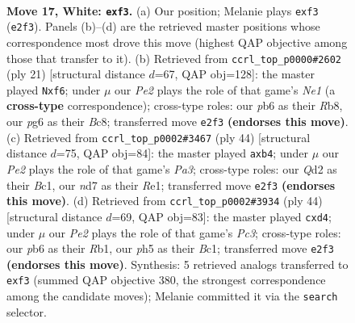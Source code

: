 \documentclass[11pt]{article}
\begin{document}
\clearpage

\begin{figure}[p]\centering
\begin{subfigure}{0.46\textwidth}\centering
\resizebox{\linewidth}{!}{%
\newchessgame
\chessboard[
  setfen={r1bq1r1k/2pn1pb1/1p1p1np1/3P3p/p1P5/2N2pPB/PPNQP2P/1RB2RK1 w - - 0 17},
  showmover=false,
  pgfstyle=straightmove, color=movearrow, markmove={e2-f3}
]}
\caption{}
\end{subfigure}\hfill
\begin{subfigure}{0.46\textwidth}\centering
\resizebox{\linewidth}{!}{%
\newchessgame
\chessboard[
  setfen={1rbqnrk1/p2pb1pp/2n1pP2/1pp5/8/2PP1NP1/PP1N1PBP/R1BQR1K1 b - - 0 11},
  showmover=false,
  pgfstyle=straightmove, color=movearrow, markmove={e8-f6}
]}
\caption{}
\end{subfigure}
\\[4pt]
\begin{subfigure}{0.46\textwidth}\centering
\resizebox{\linewidth}{!}{%
\newchessgame
\chessboard[
  setfen={b2rrbk1/2qn1pp1/2pp1n1p/1p6/1p1PP3/P4NNP/2B1QPP1/1RB1R1K1 w - - 0 23},
  showmover=false,
  pgfstyle=straightmove, color=movearrow, markmove={a3-b4}
]}
\caption{}
\end{subfigure}\hfill
\begin{subfigure}{0.46\textwidth}\centering
\resizebox{\linewidth}{!}{%
\newchessgame
\chessboard[
  setfen={b2rrbk1/2qn1pp1/2pp1n1p/1p6/1P1pP3/2P2NNP/2B1QPP1/1RB1R1K1 w - - 0 23},
  showmover=false,
  pgfstyle=straightmove, color=movearrow, markmove={c3-d4}
]}
\caption{}
\end{subfigure}
\caption{\textbf{Move 17, White: \texttt{exf3}.} (a) Our position; Melanie plays \texttt{exf3} (\texttt{e2f3}). Panels (b)--(d) are the retrieved master positions whose correspondence most drove this move (highest QAP objective among those that transfer to it). (b) Retrieved from \texttt{ccrl\_top\_p0000\#2602} (ply 21) [structural distance $d$=67, QAP obj=128]: the master played \texttt{Nxf6}; under $\mu$ our \emph{Pe2} plays the role of that game's \emph{Ne1} (a \textbf{cross-type} correspondence); cross-type roles: our \emph{p}b6 as their \emph{R}b8, our \emph{p}g6 as their \emph{B}c8; transferred move \texttt{e2f3} \textbf{(endorses this move)}. (c) Retrieved from \texttt{ccrl\_top\_p0002\#3467} (ply 44) [structural distance $d$=75, QAP obj=84]: the master played \texttt{axb4}; under $\mu$ our \emph{Pe2} plays the role of that game's \emph{Pa3}; cross-type roles: our \emph{Q}d2 as their \emph{B}c1, our \emph{n}d7 as their \emph{R}e1; transferred move \texttt{e2f3} \textbf{(endorses this move)}. (d) Retrieved from \texttt{ccrl\_top\_p0002\#3934} (ply 44) [structural distance $d$=69, QAP obj=83]: the master played \texttt{cxd4}; under $\mu$ our \emph{Pe2} plays the role of that game's \emph{Pc3}; cross-type roles: our \emph{p}b6 as their \emph{R}b1, our \emph{p}h5 as their \emph{B}c1; transferred move \texttt{e2f3} \textbf{(endorses this move)}. Synthesis: 5 retrieved analogs transferred to \texttt{exf3} (summed QAP objective 380, the strongest correspondence among the candidate moves); Melanie committed it via the \texttt{search} selector.}
\label{fig:thought-m32}
\end{figure}
\end{document}
